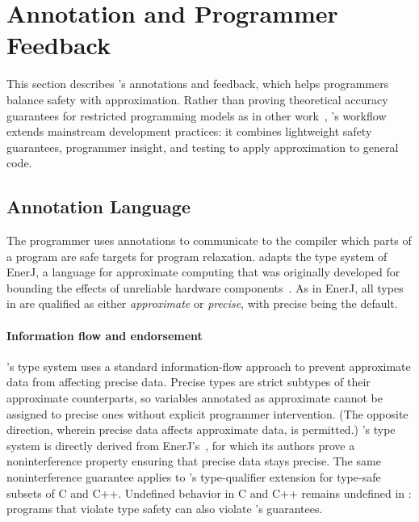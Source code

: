 \section{Annotation and Programmer Feedback}
\label{accept:sec:annotation-feedback}

This section describes \sysname's annotations and feedback,
which helps programmers balance safety with approximation.
Rather than proving theoretical accuracy guarantees for restricted programming
models as in other work~\cite{sasa-sas11, zhu-popl12, passert},
\sysname's workflow extends mainstream development practices: it combines
lightweight safety guarantees, programmer insight, and testing to apply
approximation to general code.

\subsection{Annotation Language}
\label{accept:sec:language}

The programmer uses annotations to communicate to the compiler which parts of
a program are safe targets for program relaxation.
\sysname adapts the type system of EnerJ, a language for approximate computing
that was originally developed for bounding the effects of unreliable hardware
components~\cite{enerj}.
As in EnerJ, all types in \sysname are qualified as either \emph{approximate} or
\emph{precise}, with precise being the default.

\paragraph{Information flow and endorsement}
\sysname's type system uses a standard information-flow
approach to prevent approximate data from affecting precise data.
%
Precise types are strict subtypes of their approximate counterparts, so
variables annotated as approximate cannot be assigned to precise ones without
explicit programmer intervention.  (The opposite direction, wherein precise data
affects approximate data, is permitted.)
%
\sysname's type system is directly derived from EnerJ's~\cite{enerj}, for which
its authors prove a noninterference property ensuring that precise data stays
precise.  The same noninterference guarantee applies to \sysname's
type-qualifier extension for type-safe subsets of C and C++.
Undefined behavior in C and C++ remains undefined in \sysname:
programs that violate type safety can also violate \sysname's guarantees.

